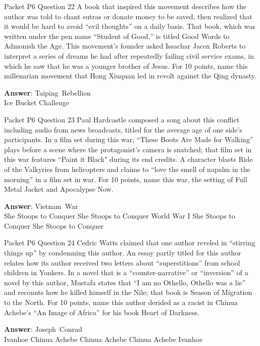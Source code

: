 \begin{frame}{Packet P6 Question 22}
A book that inspired this movement describes how the author was told to chant sutras or donate money to   be saved, then realized that it would be hard to avoid “evil thoughts” on a daily basis. That book, which was written under the pen name “Student of Good,” is titled Good Words to Admonish the Age. This movement’s founder asked Issachar Jacox   Roberts to interpret   a series of dreams   he had after repeatedly failing civil service exams, in which he saw that he was a younger brother of Jesus. For 10 points, name this millenarian movement that Hong Xiuquan led   in revolt against the Qing dynasty.

\textbf{Answer}: Taiping\ Rebellion\\
 Ice Bucket Challenge
\end{frame}

\begin{frame}{Packet P6 Question 23}
Paul Hardcastle composed     a song about this conflict including audio from news broadcasts, titled for the average age of one side’s participants. In a film set during this war, ``These Boots Are Made for Walking'' plays before a scene where the protagonist’s camera is snatched; that film set in this war   features “Paint it Black" during its end   credits. A character blasts Ride of the Valkyries from helicopters and claims to “love the smell of napalm in the morning”   in a film set in war. For 10 points, name this war, the setting of Full Metal Jacket and Apocalypse Now.    

\textbf{Answer}: Vietnam\ War\\
 She Stoops to Conquer
 She Stoops to Conquer
 World War I
 She Stoops to Conquer
 She Stoops to Conquer
\end{frame}

\begin{frame}{Packet P6 Question 24}
Cedric Watts claimed that   one author reveled in “stirring things up” by condemning this author. An essay partly titled for this author relates how its author received two letters about ``superstitions'' from school children in Yonkers. In a novel   that is a ``counter-narrative'' or ``inversion'' of a novel by this author, Mustafa states that “I am no Othello, Othello was a lie” and recounts how he killed himself in the Nile; that book is Season of Migration to the North. For 10 points, name this author derided as a racist in Chinua Achebe's “An   Image of Africa” for   his book Heart of Darkness.      

\textbf{Answer}: Joseph\ Conrad\\
 Ivanhoe
 Chinua Achebe
 Chinua Achebe
 Chinua Achebe
 Ivanhoe
\end{frame}

